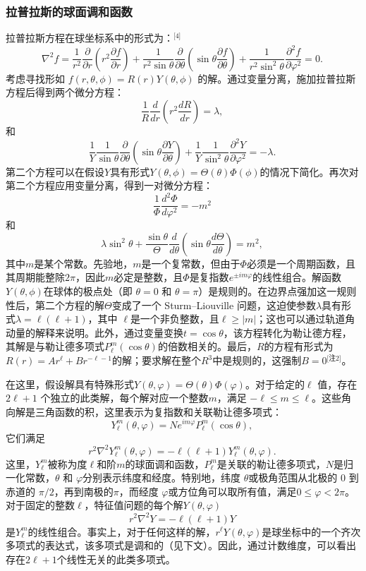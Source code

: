 \subsubsection{拉普拉斯的球面调和函数}
拉普拉斯方程在球坐标系中的形式为：\(^\text{[4]}\)
\[
\nabla^2 f = \frac{1}{r^2} \frac{\partial}{\partial r} \left( r^2 \frac{\partial f}{\partial r} \right) + \frac{1}{r^2 \sin \theta} \frac{\partial}{\partial \theta} \left( \sin \theta \frac{\partial f}{\partial \theta} \right) + \frac{1}{r^2 \sin^2 \theta} \frac{\partial^2 f}{\partial \varphi^2} = 0.~
\]
考虑寻找形如 \( f(r, \theta, \phi) = R(r) Y(\theta, \phi) \) 的解。通过变量分离，施加拉普拉斯方程后得到两个微分方程：
\[
\frac{1}{R} \frac{d}{dr} \left( r^2 \frac{dR}{dr} \right) = \lambda,~
\]
和
\[
\frac{1}{Y} \frac{1}{\sin \theta} \frac{\partial}{\partial \theta} \left( \sin \theta \frac{\partial Y}{\partial \theta} \right) + \frac{1}{Y} \frac{1}{\sin^2 \theta} \frac{\partial^2 Y}{\partial \varphi^2} = -\lambda.~
\]
第二个方程可以在假设\( Y \)具有形式\( Y(\theta, \phi) = \Theta(\theta) \Phi(\phi) \)的情况下简化。再次对第二个方程应用变量分离，得到一对微分方程：
\[
\frac{1}{\Phi} \frac{d^2 \Phi}{d \varphi^2} = -m^2~
\]
和
\[
\lambda \sin^2 \theta + \frac{\sin \theta}{\Theta} \frac{d}{d\theta} \left( \sin \theta \frac{d \Theta}{d \theta} \right) = m^2,~
\]
其中\( m \)是某个常数。先验地，\( m \)是一个复常数，但由于\( \Phi \)必须是一个周期函数，且其周期能整除\( 2\pi \)，因此\( m \)必定是整数，且\( \Phi \)是复指数\( e^{\pm im\varphi} \)的线性组合。解函数\( Y(\theta, \phi) \)在球体的极点处（即 \( \theta = 0 \) 和 \( \theta = \pi \)）是规则的。在边界点强加这一规则性后，第二个方程的解\( \Theta \)变成了一个 Sturm–Liouville 问题，这迫使参数\( \lambda \)具有形式\( \lambda = \ell (\ell + 1) \)，其中 \( \ell \)是一个非负整数，且\( \ell \geq |m| \)；这也可以通过轨道角动量的解释来说明。此外，通过变量变换\( t = \cos \theta \)，该方程转化为勒让德方程，其解是与勒让德多项式\( P_\ell^m(\cos \theta) \)的倍数相关的。最后，\( R \)的方程有形式为\( R(r) = A r^\ell + B r^{-\ell - 1} \)的解；要求解在整个\( R^3 \)中是规则的，这强制\( B = 0 \)\(^\text{[注2]}\)。

在这里，假设解具有特殊形式\( Y(\theta, \varphi) = \Theta(\theta) \Phi(\varphi) \)。对于给定的\( \ell \) 值，存在 \( 2\ell + 1 \) 个独立的此类解，每个解对应一个整数\( m \)，满足 \( -\ell \leq m \leq \ell \)。这些角向解是三角函数的积，这里表示为复指数和关联勒让德多项式：
\[
Y_{\ell}^{m}(\theta, \varphi) = N e^{im\varphi} P_{\ell}^{m}(\cos \theta),~
\]
它们满足
\[
r^2 \nabla^2 Y_{\ell}^{m}(\theta, \varphi) = -\ell (\ell + 1) Y_{\ell}^{m}(\theta, \varphi).~
\]
这里，\( Y_{\ell}^m \)被称为度\( \ell \)和阶\( m \)的球面调和函数，\( P_{\ell}^m \)是关联的勒让德多项式，\( N \)是归一化常数，\( \theta \) 和 \( \varphi \)分别表示纬度和经度。特别地，纬度 \( \theta \)或极角范围从北极的 0 到赤道的 \( \pi/2 \)，再到南极的\( \pi \)，而经度 \( \varphi \)或方位角可以取所有值，满足\( 0 \leq \varphi < 2\pi \)。对于固定的整数\( \ell \)，特征值问题的每个解\( Y(\theta, \varphi) \)
\[
r^2 \nabla^2 Y = -\ell (\ell + 1) Y~
\]
是\( Y_{\ell}^m \)的线性组合。事实上，对于任何这样的解，\( r^\ell Y(\theta, \varphi) \)是球坐标中的一个齐次多项式的表达式，该多项式是调和的（见下文）。因此，通过计数维度，可以看出存在\( 2\ell + 1 \)个线性无关的此类多项式。